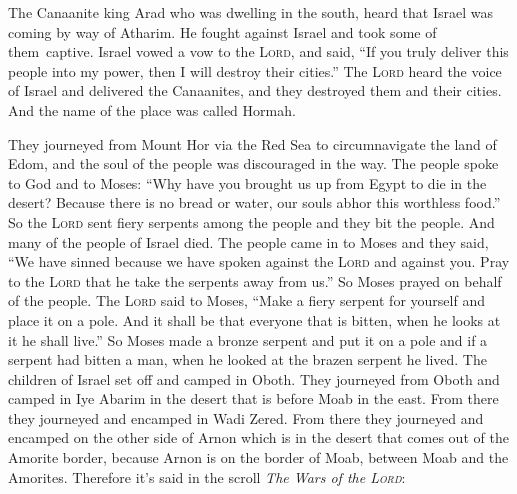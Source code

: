 
\begin{inparaenum}
   The Canaanite king Arad who was dwelling in the south, heard that Israel was coming by way of Atharim. He fought against Israel and took some of them\understood\ captive.%
   Israel vowed a vow to the \textsc{Lord}, and said, ``If you truly deliver this people into my power, then I will destroy their cities.''%
   The \textsc{Lord} heard the voice of Israel and delivered the Canaanites, and they destroyed them and their cities. And the name of the place was called Hormah.%
  
   They journeyed from Mount Hor via the Red Sea to circumnavigate the land of Edom, and the soul of the people was discouraged in the way.%
   The people spoke to God and to Moses: ``Why have you brought us up from Egypt to die in the desert? Because there is no bread or water, our souls abhor this worthless food.''%
   So the \textsc{Lord} sent fiery serpents among the people and they bit the people. And many of the people of Israel died.%
   The people came in to Moses and they said, ``We have sinned because we have spoken against the \textsc{Lord} and against you. Pray to the \textsc{Lord} that he take the serpents away from us.'' So Moses prayed on behalf of the people.%
   The \textsc{Lord} said to Moses, ``Make a fiery serpent for yourself and place it on a pole. And it shall be that everyone that is bitten, when he looks at it he shall live.''%
   So Moses made a bronze serpent and put it on a pole and if a serpent had bitten a man, when he looked at the brazen serpent he lived.%
   The children of Israel set off and camped in Oboth.%
   They journeyed from Oboth and camped in Iye Abarim in the desert that is before Moab in the east.%
   From there they journeyed and encamped in Wadi Zered.%
   From there they journeyed and encamped on the other side of Arnon which is in the desert that comes out of the Amorite border, because Arnon is on the border of Moab, between Moab and the Amorites.%
   Therefore it's said in the scroll \textit{The Wars of the \textsc{Lord}}:\smallskip%
  

\end{inparaenum}
